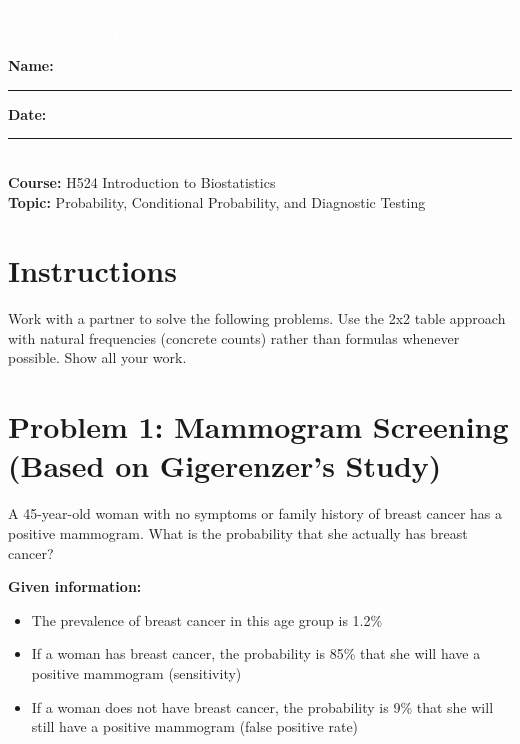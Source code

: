 \documentclass[11pt]{article}
\title{}
\author{}
\date{}
\begin{document}
\begin{tcolorbox}[colback=osaorange,colframe=black,boxrule=2pt,arc=0pt,left=6pt,right=6pt,top=10pt,bottom=10pt]
\centering
\textcolor{white}{\textbf{\Large In-Class Worksheet}}\\
\textcolor{white}{\textbf{\large Probability and Conditional Probability}}
\end{tcolorbox}

\vspace{8pt}

\noindent\textbf{Name:} \rule{8cm}{0.4pt} \hfill \textbf{Date:} \rule{4cm}{0.4pt}\\[0.5ex]
\textbf{Course:} H524 Introduction to Biostatistics\\
\textbf{Topic:} Probability, Conditional Probability, and Diagnostic Testing

\vspace{8pt}

\section*{Instructions}
Work with a partner to solve the following problems. Use the 2x2 table approach with natural frequencies (concrete counts) rather than formulas whenever possible. Show all your work.

\vspace{12pt}

\section{Problem 1: Mammogram Screening (Based on Gigerenzer's Study)}

A 45-year-old woman with no symptoms or family history of breast cancer has a positive mammogram. What is the probability that she actually has breast cancer?

\vspace{6pt}

\textbf{Given information:}
\begin{itemize}
\item The prevalence of breast cancer in this age group is 1.2\%
\item If a woman has breast cancer, the probability is 85\% that she will have a positive mammogram (sensitivity)
\item If a woman does not have breast cancer, the probability is 9\% that she will still have a positive mammogram (false positive rate)
\end{itemize}
\end{document}

